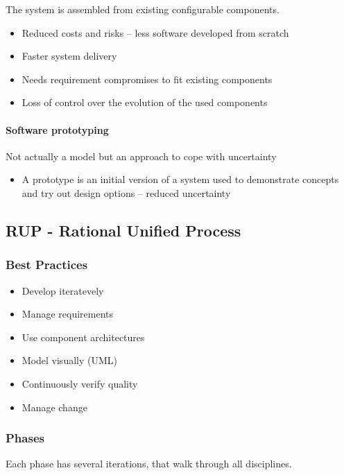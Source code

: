 \documentclass[../ESOF_notes.tex]{subfiles}
\begin{document}
The system is assembled from existing configurable components.

\begin{itemize}
    \item Reduced costs and risks – less software developed from scratch
    \item Faster system delivery
    \item Needs requirement compromises to fit existing components
    \item Loss of control over the evolution of the used components
\end{itemize}

\paragraph{Software prototyping} 

Not actually a model but an approach to cope with uncertainty

\begin{itemize}
    \item A prototype is an initial version of a system used to demonstrate concepts and try out design options – reduced uncertainty
\end{itemize}

\subsection{RUP - Rational Unified Process}

\subsubsection{Best Practices}
\begin{itemize}
    \item Develop iteratevely
    \item Manage requirements
    \item Use component architectures
    \item Model visually (UML)
    \item Continuously verify quality
    \item Manage change
\end{itemize}

\subsubsection{Phases}

Each phase has several iterations, that walk through all disciplines.
\end{document}

